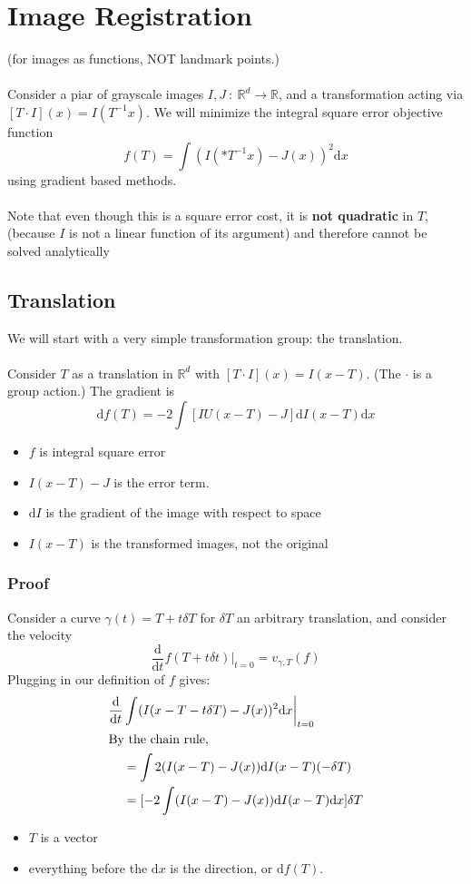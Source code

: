 \documentclass[10pt]{article}
\newcommand{\R}{\mathbb{R}}
\newcommand{\dd}{\text{d}}
\begin{document}
\section*{Image Registration}
(for images as functions, NOT landmark points.)\\\\
Consider a piar of grayscale images $I, J \::\: \R^d \rightarrow \R$, and a transformation acting via $[T \cdot I](x) = I(T^{-1}x)$.  We will minimize the integral square error objective function
\[f(T) = \int (I(*T^{-1} x) - J(x))^2 \dd x\]
using gradient based methods.\\\\
Note that even though this is a square error cost, it is \textbf{not quadratic} in $T$, (because $I$ is not a linear function of its argument) and therefore cannot be solved analytically

\subsection*{Translation}
We will start with a very simple transformation group: the translation.\\\\
Consider $T$ as a translation in $\R^d$ with $[T \cdot I](x) = I(x - T)$.  (The $\cdot$ is a group action.)  The gradient is
\[\dd f(T) = -2 \int [IU(x - T) - J] \dd I(x - T) \dd x\]
\begin{itemize}
    \item $f$ is integral square error
    \item $I(x - T) - J$ is the error term.
    \item $\dd I$ is the gradient of the image with respect to space
    \item $I(x - T)$ is the transformed images, not the original
\end{itemize}

\subsubsection*{Proof}
Consider a curve $\gamma(t) = T + t\delta T$ for $\delta T$ an arbitrary translation, and consider the velocity
\[\frac{\dd}{\dd t} f(T + t\delta t) \bigg|_{t = 0} = v_{\gamma, T}(f)\]
Plugging in our definition of $f$ gives:
\begin{align*}
    \frac{\dd}{\dd t} &\int (I(x - T - t\delta T) - J(x))^2 \dd x \bigg|_{t = 0}\\
    \intertext{By the chain rule,}
    &= \int 2(I(x - T) - J(x)) \dd I(x - T)(-\delta T)\\
    &= [-2 \int(I(x - T) - J(x)) \dd I(x - T) \dd x] \delta T
\end{align*}
\begin{itemize}
	\item $T$ is a vector
	\item everything before the $\dd x$ is the direction, or $\dd f(T)$.
\end{itemize}
\end{document}
